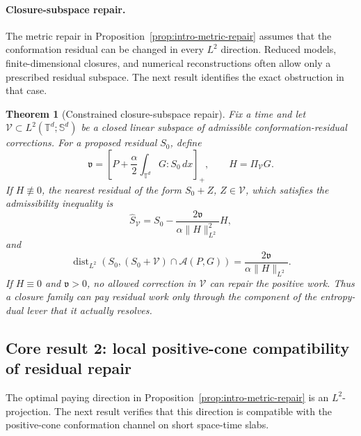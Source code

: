 \documentclass[11pt]{article}
\numberwithin{equation}{section}
\newtheorem{maintheorem}{Theorem}
\begin{document}
\paragraph{Closure-subspace repair.}

The metric repair in Proposition~\ref{prop:intro-metric-repair} assumes that the conformation residual can be
changed in every \(L^2\) direction.  Reduced models, finite-dimensional closures,
and numerical reconstructions often allow only a prescribed residual subspace.
The next result identifies the exact obstruction in that case.

\begin{maintheorem}[Constrained closure-subspace repair]
\label{thm:subspace-repair-main}
Fix a time and let \(\mathcal V\subset L^2(\mathbb T^d;\mathbb S^d)\) be a
closed linear subspace of admissible conformation-residual corrections.  For a
proposed residual \(S_0\), define
\[
  \mathfrak v=
  \left[P+\frac{\alpha}{2}\int_{\mathbb T^d}G:S_0\,dx\right]_+,
  \qquad H=\Pi_{\mathcal V}G .
\]
If \(H\not\equiv0\), the nearest residual of the form \(S_0+Z\),
\(Z\in\mathcal V\), which satisfies the admissibility inequality is
\[
  \widehat S_{\mathcal V}
  =
  S_0-
  \frac{2\mathfrak v}{\alpha\|H\|_{L^2}^2}H,
\]
and
\[
  \operatorname{dist}_{L^2}\left(S_0,(S_0+\mathcal V)\cap\mathcal A(P,G)\right)
  =
  \frac{2\mathfrak v}{\alpha\|H\|_{L^2}} .
\]
If \(H\equiv0\) and \(\mathfrak v>0\), no allowed correction in \(\mathcal V\)
can repair the positive work.  Thus a closure family can pay residual work only
through the component of the entropy-dual lever that it actually resolves.
\end{maintheorem}

\subsection*{Core result 2: local positive-cone compatibility of residual repair}

The optimal paying direction in Proposition~\ref{prop:intro-metric-repair} is an \(L^2\)-projection.  The next
result verifies that this direction is compatible with the positive-cone
conformation channel on short space-time slabs.
\end{document}
